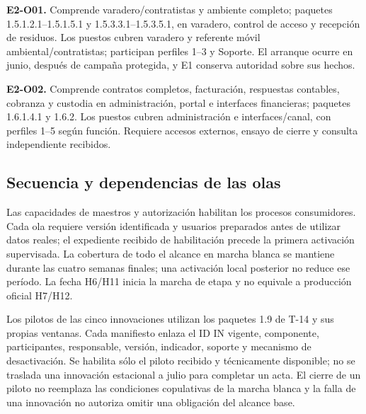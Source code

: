 \textbf{E2-O01.} Comprende varadero/contratistas y ambiente completo; paquetes 1.5.1.2.1--1.5.1.5.1 y 1.5.3.3.1--1.5.3.5.1, en varadero, control de acceso y recepción de residuos. Los puestos cubren varadero y referente móvil ambiental/contratistas; participan perfiles 1--3 y Soporte. El arranque ocurre en junio, después de campaña protegida, y E1 conserva autoridad sobre sus hechos.

\textbf{E2-O02.} Comprende contratos completos, facturación, respuestas contables, cobranza y custodia en administración, portal e interfaces financieras; paquetes 1.6.1.4.1 y 1.6.2. Los puestos cubren administración e interfaces/canal, con perfiles 1--5 según función. Requiere accesos externos, ensayo de cierre y consulta independiente recibidos.

\subsection{Secuencia y dependencias de las olas}
Las capacidades de maestros y autorización habilitan los procesos consumidores. Cada ola requiere versión identificada y usuarios preparados antes de utilizar datos reales; el expediente recibido de habilitación precede la primera activación supervisada. La cobertura de todo el alcance en marcha blanca se mantiene durante las cuatro semanas finales; una activación local posterior no reduce ese período. La fecha H6/H11 inicia la marcha de etapa y no equivale a producción oficial H7/H12.

Los pilotos de las cinco innovaciones utilizan los paquetes 1.9 de T-14 y sus propias ventanas. Cada manifiesto enlaza el ID IN vigente, componente, participantes, responsable, versión, indicador, soporte y mecanismo de desactivación. Se habilita sólo el piloto recibido y técnicamente disponible; no se traslada una innovación estacional a julio para completar un acta. El cierre de un piloto no reemplaza las condiciones copulativas de la marcha blanca y la falla de una innovación no autoriza omitir una obligación del alcance base.

